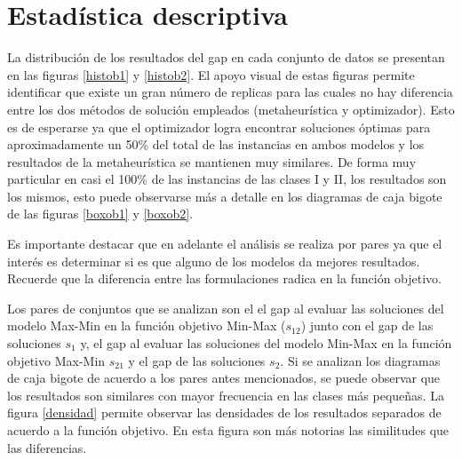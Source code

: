 \documentclass[preprint,12pt,authoryear]{elsarticle}
\begin{document}

\section{Estadística descriptiva}
\label{ed}


La distribución de los resultados del gap en cada conjunto de datos se presentan en las figuras \ref{histob1} y \ref{histob2}. El apoyo visual de estas figuras permite identificar que existe un gran número de replicas para las cuales no hay diferencia entre los dos métodos de solución empleados (metaheurística y optimizador). Esto es de esperarse ya que el optimizador logra encontrar soluciones óptimas para aproximadamente un 50\% del total de las instancias en ambos modelos y los resultados de la metaheurística se mantienen muy similares. De forma muy particular en casi el 100\% de las instancias de las clases I y II, los resultados son los mismos, esto puede observarse más a detalle en los diagramas de caja bigote de las figuras \ref{boxob1} y \ref{boxob2}.

Es importante destacar que en adelante el análisis se realiza por pares ya que el interés es determinar si es que alguno de los modelos da mejores resultados. Recuerde que la diferencia entre las formulaciones radica en la función objetivo. 

Los pares de conjuntos que se analizan son el el gap al evaluar las soluciones del modelo Max-Min en la función objetivo Min-Max ($s_{12}$) junto con el gap de las soluciones $s_1$ y, el gap al evaluar las soluciones del modelo Min-Max en la función objetivo Max-Min $s_{21}$ y el gap de las soluciones $s_{2}$. Si se analizan los diagramas de caja bigote de acuerdo a los pares antes mencionados, se puede observar que los resultados son similares con mayor frecuencia en las clases más pequeñas. La figura \ref{densidad} permite observar las densidades de los resultados separados de acuerdo a la función objetivo. En esta figura son más notorias las similitudes que las diferencias.
\end{document}
